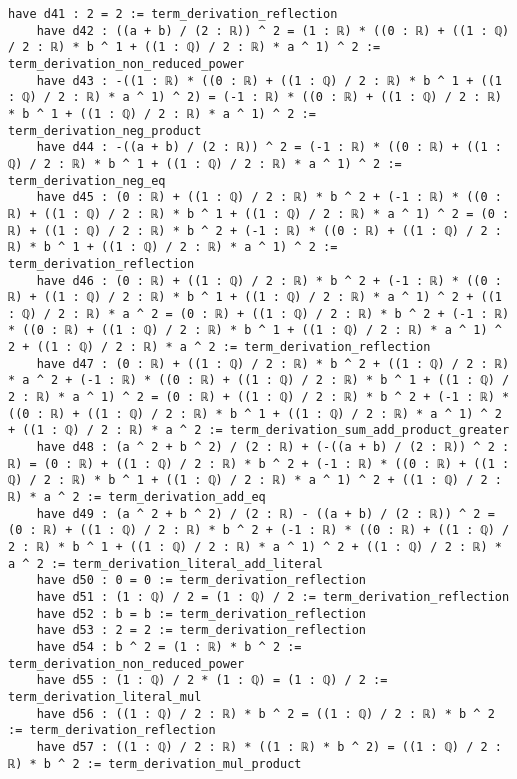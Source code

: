 \documentclass{article}
\begin{document}
\begin{tcolorbox}[colback=white!10, width=\linewidth]
\begin{lstlisting}[language=Lean4]
    have d41 : 2 = 2 := term_derivation_reflection
    have d42 : ((a + b) / (2 : ℝ)) ^ 2 = (1 : ℝ) * ((0 : ℝ) + ((1 : ℚ) / 2 : ℝ) * b ^ 1 + ((1 : ℚ) / 2 : ℝ) * a ^ 1) ^ 2 := term_derivation_non_reduced_power
    have d43 : -((1 : ℝ) * ((0 : ℝ) + ((1 : ℚ) / 2 : ℝ) * b ^ 1 + ((1 : ℚ) / 2 : ℝ) * a ^ 1) ^ 2) = (-1 : ℝ) * ((0 : ℝ) + ((1 : ℚ) / 2 : ℝ) * b ^ 1 + ((1 : ℚ) / 2 : ℝ) * a ^ 1) ^ 2 := term_derivation_neg_product
    have d44 : -((a + b) / (2 : ℝ)) ^ 2 = (-1 : ℝ) * ((0 : ℝ) + ((1 : ℚ) / 2 : ℝ) * b ^ 1 + ((1 : ℚ) / 2 : ℝ) * a ^ 1) ^ 2 := term_derivation_neg_eq
    have d45 : (0 : ℝ) + ((1 : ℚ) / 2 : ℝ) * b ^ 2 + (-1 : ℝ) * ((0 : ℝ) + ((1 : ℚ) / 2 : ℝ) * b ^ 1 + ((1 : ℚ) / 2 : ℝ) * a ^ 1) ^ 2 = (0 : ℝ) + ((1 : ℚ) / 2 : ℝ) * b ^ 2 + (-1 : ℝ) * ((0 : ℝ) + ((1 : ℚ) / 2 : ℝ) * b ^ 1 + ((1 : ℚ) / 2 : ℝ) * a ^ 1) ^ 2 := term_derivation_reflection
    have d46 : (0 : ℝ) + ((1 : ℚ) / 2 : ℝ) * b ^ 2 + (-1 : ℝ) * ((0 : ℝ) + ((1 : ℚ) / 2 : ℝ) * b ^ 1 + ((1 : ℚ) / 2 : ℝ) * a ^ 1) ^ 2 + ((1 : ℚ) / 2 : ℝ) * a ^ 2 = (0 : ℝ) + ((1 : ℚ) / 2 : ℝ) * b ^ 2 + (-1 : ℝ) * ((0 : ℝ) + ((1 : ℚ) / 2 : ℝ) * b ^ 1 + ((1 : ℚ) / 2 : ℝ) * a ^ 1) ^ 2 + ((1 : ℚ) / 2 : ℝ) * a ^ 2 := term_derivation_reflection
    have d47 : (0 : ℝ) + ((1 : ℚ) / 2 : ℝ) * b ^ 2 + ((1 : ℚ) / 2 : ℝ) * a ^ 2 + (-1 : ℝ) * ((0 : ℝ) + ((1 : ℚ) / 2 : ℝ) * b ^ 1 + ((1 : ℚ) / 2 : ℝ) * a ^ 1) ^ 2 = (0 : ℝ) + ((1 : ℚ) / 2 : ℝ) * b ^ 2 + (-1 : ℝ) * ((0 : ℝ) + ((1 : ℚ) / 2 : ℝ) * b ^ 1 + ((1 : ℚ) / 2 : ℝ) * a ^ 1) ^ 2 + ((1 : ℚ) / 2 : ℝ) * a ^ 2 := term_derivation_sum_add_product_greater
    have d48 : (a ^ 2 + b ^ 2) / (2 : ℝ) + (-((a + b) / (2 : ℝ)) ^ 2 : ℝ) = (0 : ℝ) + ((1 : ℚ) / 2 : ℝ) * b ^ 2 + (-1 : ℝ) * ((0 : ℝ) + ((1 : ℚ) / 2 : ℝ) * b ^ 1 + ((1 : ℚ) / 2 : ℝ) * a ^ 1) ^ 2 + ((1 : ℚ) / 2 : ℝ) * a ^ 2 := term_derivation_add_eq
    have d49 : (a ^ 2 + b ^ 2) / (2 : ℝ) - ((a + b) / (2 : ℝ)) ^ 2 = (0 : ℝ) + ((1 : ℚ) / 2 : ℝ) * b ^ 2 + (-1 : ℝ) * ((0 : ℝ) + ((1 : ℚ) / 2 : ℝ) * b ^ 1 + ((1 : ℚ) / 2 : ℝ) * a ^ 1) ^ 2 + ((1 : ℚ) / 2 : ℝ) * a ^ 2 := term_derivation_literal_add_literal
    have d50 : 0 = 0 := term_derivation_reflection
    have d51 : (1 : ℚ) / 2 = (1 : ℚ) / 2 := term_derivation_reflection
    have d52 : b = b := term_derivation_reflection
    have d53 : 2 = 2 := term_derivation_reflection
    have d54 : b ^ 2 = (1 : ℝ) * b ^ 2 := term_derivation_non_reduced_power
    have d55 : (1 : ℚ) / 2 * (1 : ℚ) = (1 : ℚ) / 2 := term_derivation_literal_mul
    have d56 : ((1 : ℚ) / 2 : ℝ) * b ^ 2 = ((1 : ℚ) / 2 : ℝ) * b ^ 2 := term_derivation_reflection
    have d57 : ((1 : ℚ) / 2 : ℝ) * ((1 : ℝ) * b ^ 2) = ((1 : ℚ) / 2 : ℝ) * b ^ 2 := term_derivation_mul_product

\end{lstlisting}
\end{tcolorbox}
\end{document}
